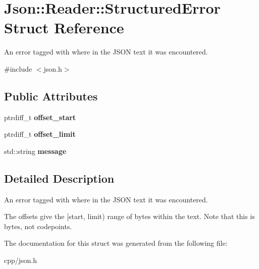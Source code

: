 \hypertarget{struct_json_1_1_reader_1_1_structured_error}{}\section{Json\+:\+:Reader\+:\+:Structured\+Error Struct Reference}
\label{struct_json_1_1_reader_1_1_structured_error}


An error tagged with where in the J\+S\+ON text it was encountered.  




{\ttfamily \#include $<$json.\+h$>$}

\subsection*{Public Attributes}
\begin{DoxyCompactItemize}
\item 
\mbox{\label{struct_json_1_1_reader_1_1_structured_error_ac98af0da2d704be4b64a9572a682423b}} 
ptrdiff\+\_\+t {\bfseries offset\+\_\+start}
\item 
\mbox{\label{struct_json_1_1_reader_1_1_structured_error_ad76ac01aeb0ada7e882c2df5daa54c6e}} 
ptrdiff\+\_\+t {\bfseries offset\+\_\+limit}
\item 
\mbox{\label{struct_json_1_1_reader_1_1_structured_error_ab8755e5201b78c6ae077338f8819e6e6}} 
std\+::string {\bfseries message}
\end{DoxyCompactItemize}


\subsection{Detailed Description}
An error tagged with where in the J\+S\+ON text it was encountered. 

The offsets give the \mbox{[}start, limit) range of bytes within the text. Note that this is bytes, not codepoints. 

The documentation for this struct was generated from the following file\+:\begin{DoxyCompactItemize}
\item 
cpp/json.\+h\end{DoxyCompactItemize}
